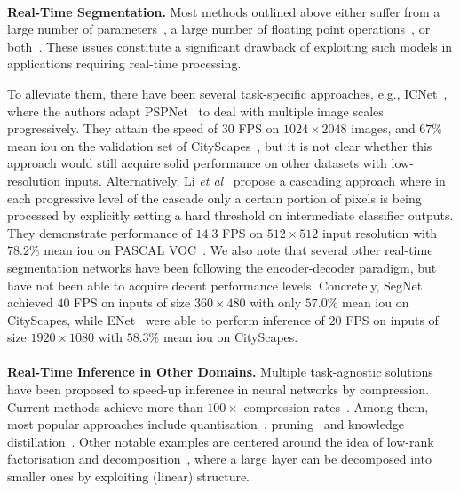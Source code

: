 \documentclass{bmvc2k}
\def\etal{\emph{et al}\bmvaOneDot}
\begin{document}
\\
\textbf{Real-Time Segmentation.} Most methods outlined above either suffer from a large number of parameters~\cite{LinMSR17}, a large number of floating point operations~\cite{ChenPKMY14,ChenPK0Y16,ChenPSA17,ZhaoSQWJ17}, or both~\cite{PaszkeCKC16,NohHH15,LongSD15,YangLZ17}. These issues constitute a significant drawback of exploiting such models in applications requiring real-time processing.

To alleviate them, there have been several task-specific approaches, e.g., ICNet~\cite{ZhaoQSSJ17}, where the authors adapt PSPNet~\cite{ZhaoSQWJ17} to deal with multiple image scales progressively. 
They attain the speed of $30$ FPS on $1024\times2048$ images, and $67\%$ mean iou on the validation set of CityScapes~\cite{CordtsORREBFRS16}, but it is not clear whether this approach would still acquire solid performance on other datasets with low-resolution inputs. Alternatively, Li \etal~\cite{LiLLLT17} propose a cascading approach where in each progressive level of the cascade only a certain portion of pixels is being processed by explicitly setting a hard threshold on intermediate classifier outputs. They demonstrate performance of $14.3$ FPS on $512\times512$ input resolution with $78.2\%$ mean iou on PASCAL VOC~\cite{EveringhamGWWZ10}. We also note that several other real-time segmentation networks have been following the encoder-decoder paradigm, but have not been able to acquire decent performance levels. Concretely, SegNet~\cite{BadrinarayananH15} achieved $40$ FPS on inputs of size $360\times480$ with only $57.0\%$ mean iou on CityScapes, while ENet~\cite{PaszkeCKC16} were able to perform inference of $20$ FPS on inputs of size $1920\times1080$ with $58.3\%$ mean iou on CityScapes.\\
\\
\textbf{Real-Time Inference in Other Domains.} Multiple task-agnostic solutions have been proposed to speed-up inference in neural networks by compression. Current methods achieve more than $100\times$ compression rates~\cite{IandolaMAHDK16}. Among them, most popular approaches include quantisation~\cite{GongLYB14,ZhouNZWWZ16,ZhouYGXC17}, pruning~\cite{HanPTD15,CunDS89,HassibiS92,HanMD15} and knowledge distillation~\cite{BaC14,HintonVD15,BucilaCN06,RomeroBKCGB14}.
Other notable examples are centered around the idea of low-rank factorisation and decomposition~\cite{DentonZBLF14,JaderbergVZ14}, where a large layer can be decomposed into smaller ones by exploiting (linear) structure. 
	
\end{document}
